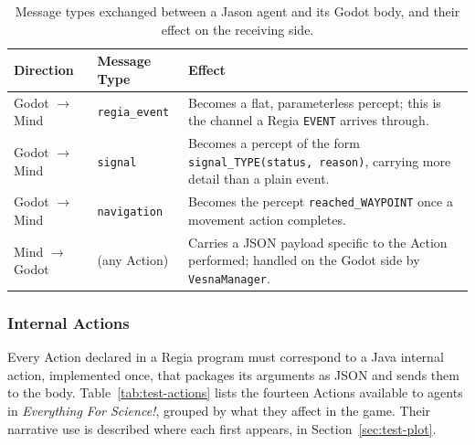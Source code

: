 \begin{table}[htpb]
\centering
\small
\begin{tabular}{|l|l|p{6.5cm}|}
\hline
\textbf{Direction} & \textbf{Message Type} & \textbf{Effect} \\
\hline
Godot $\to$ Mind & \lstinline|regia_event| & Becomes a flat, parameterless percept; this is the channel a Regia \lstinline|EVENT| arrives through. \\
\hline
Godot $\to$ Mind & \lstinline|signal| & Becomes a percept of the form \lstinline|signal_TYPE(status, reason)|, carrying more detail than a plain event. \\
\hline
Godot $\to$ Mind & \lstinline|navigation| & Becomes the percept \lstinline|reached_WAYPOINT| once a movement action completes. \\
\hline
Mind $\to$ Godot & (any Action) & Carries a JSON payload specific to the Action performed; handled on the Godot side by \lstinline|VesnaManager|. \\
\hline
\end{tabular}
\caption{Message types exchanged between a Jason agent and its Godot body, and their effect on the receiving side.}
\label{tab:test-message-protocol}
\end{table}

\subsubsection{Internal Actions}
\label{sec:test-actions}

Every Action declared in a Regia program must correspond to a Java internal action, implemented once, that packages its arguments as JSON and sends them to the body. Table~\ref{tab:test-actions} lists the fourteen Actions available to agents in \emph{Everything For Science!}, grouped by what they affect in the game. Their narrative use is described where each first appears, in Section~\ref{sec:test-plot}.

